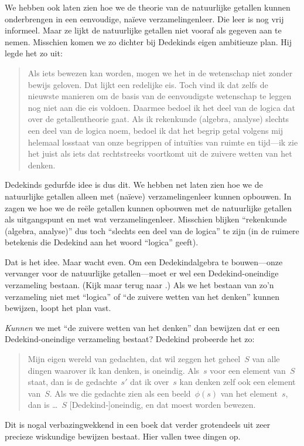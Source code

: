 \documentclass[openany]{memoir}
\begin{document}
We hebben ook laten zien hoe we de theorie van de natuurlijke getallen
kunnen onderbrengen in een eenvoudige, na\"ieve verzamelingenleer. Die
leer is nog vrij informeel. Maar ze lijkt de natuurlijke getallen niet
vooraf als gegeven aan te nemen. Misschien komen we zo dichter bij
Dedekinds eigen ambitieuze plan. Hij legde het zo uit:
\begin{quote}
	Als iets bewezen kan worden, mogen we het in de wetenschap niet zonder
	bewijs geloven. Dat lijkt een redelijke eis. Toch vind ik dat zelfs de
	nieuwste manieren om de basis van de eenvoudigste wetenschap te leggen
	nog niet aan die eis voldoen. Daarmee bedoel ik het deel van de logica
	dat over de getallentheorie gaat. Als ik rekenkunde (algebra, analyse)
	slechts een deel van de logica noem, bedoel ik dat het begrip getal
	volgens mij helemaal losstaat van onze begrippen of intuïties van
	ruimte en tijd---ik zie het juist als iets dat rechtstreeks voortkomt
	uit de zuivere wetten van het denken.
	\citep[voorwoord]{Dedekind1888}
\end{quote}
Dedekinds gedurfde idee is dus dit. We hebben net laten zien hoe we de
natuurlijke getallen alleen met (na\"ieve) verzamelingenleer kunnen
opbouwen. In  zagen we hoe we de reële
getallen kunnen opbouwen met de natuurlijke getallen als uitgangspunt
en met wat verzamelingenleer. Misschien blijken ``rekenkunde (algebra,
analyse)'' dus toch ``slechts een deel van de logica'' te zijn (in de
ruimere betekenis die Dedekind aan het woord ``logica'' geeft).

Dat is het idee. Maar wacht even. Om een Dedekindalgebra te
bouwen---onze vervanger voor de natuurlijke getallen---moet er wel een
Dedekind-oneindige verzameling bestaan. (Kijk maar terug naar
.) Als we
het bestaan van zo'n verzameling niet met ``logica'' of ``de zuivere
wetten van het denken'' kunnen bewijzen, loopt het plan vast.

\emph{Kunnen} we met ``de zuivere wetten van het denken'' dan bewijzen
dat er een Dedekind-oneindige verzameling bestaat? Dedekind probeerde
het zo:
\begin{quote}
  Mijn eigen wereld van gedachten, dat wil zeggen het geheel~$S$ van alle
  dingen waarover ik kan denken, is oneindig. Als~$s$ voor een element
  van~$S$ staat, dan is de gedachte~$s'$ dat ik over~$s$ kan denken zelf
  ook een element van~$S$. Als we die gedachte zien als een
  beeld~$\phi(s)$ van het element~$s$, dan is \dots~$S$
  [Dedekind-]oneindig, en dat moest worden bewezen.
	\citep[\S66]{Dedekind1888}
\end{quote}
Dit is nogal verbazingwekkend in een boek dat verder grotendeels uit
zeer precieze wiskundige bewijzen bestaat. Hier vallen twee dingen op.
\end{document}
